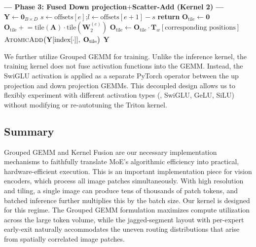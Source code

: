 \documentclass[runningheads]{llncs}
\begin{document}
\begin{algorithm}[h]
\begin{scriptsize}
\begin{algorithmic}[1]
\Statex
\Statex \textbf{--- Phase 3: Fused Down projection$+$Scatter-Add (Kernel 2) ---}
\State $\mathbf{Y} \gets \mathbf{0}_{B\times D}$
    \State $s \gets \text{offsets}[e]$;\enspace $l \gets \text{offsets}[e\!+\!1] - s$
     \textbf{return} \EndIf
    \State $\mathbf{O}_{\text{tile}} \gets \mathbf{0}$
        \State $\mathbf{O}_{\text{tile}} \mathrel{+}= \text{tile}(\mathbf{A}) \cdot \text{tile}(\mathbf{W}_2^{(e)})$
    \EndFor
    \State $\mathbf{O}_{\text{tile}} \gets \mathbf{O}_{\text{tile}} \cdot \mathbf{T}_w[\text{corresponding positions}]$
    \State $\textsc{AtomicAdd}\bigl(\mathbf{Y}[\text{index}[\cdot]],\;\mathbf{O}_{\text{tile}}\bigr)$
\EndFor
\State \Return $\mathbf{Y}$
\end{algorithmic}
\end{scriptsize} 
\end{algorithm}

We further utilize Grouped GEMM for training. Unlike the inference
kernel, the training kernel does not fuse activation functions into the
GEMM.  Instead, the SwiGLU activation is applied as a separate
PyTorch operator between the up projection and down projection GEMMs.  This
decoupled design allows us to flexibly experiment with different activation
types (\eg, SwiGLU, GeLU, SiLU) without modifying or re-autotuning the
Triton kernel.

\subsection{Summary}
Grouped GEMM and Kernel Fusion are our necessary implementation
mechanisms to faithfully translate MoE's algorithmic efficiency into
practical, hardware-efficient execution. This is an important implementation piece for vision encoders, which process all image patches simultaneously. With high resolution and tiling, a single image can produce tens of thousands of patch tokens, and batched inference further multiplies this by the batch size. Our kernel is designed for this
regime. The Grouped GEMM formulation maximizes compute utilization across the large token volume, while the jagged-segment layout with per-expert early-exit naturally accommodates the uneven routing distributions that arise from spatially correlated image patches.
\end{document}
